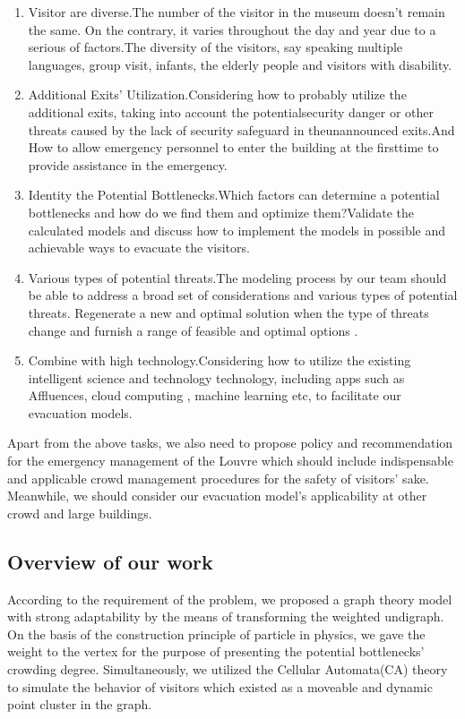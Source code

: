 \documentclass[12pt]{article}
\begin{document}
\begin{enumerate}
\item Visitor are diverse.The number of the visitor in the museum doesn't remain the same. On the contrary, it varies throughout the day and year due to a serious of factors.The diversity of the visitors, say speaking multiple languages, group visit, infants, the elderly people and visitors with disability.
\item Additional Exits' Utilization.Considering how to probably utilize the additional exits, taking into account the potentialsecurity danger or other threats caused by the lack of security safeguard in theunannounced exits.And How to allow emergency personnel to enter the building at the firsttime to provide assistance in the emergency.
\item Identity the Potential Bottlenecks.Which factors can determine a potential bottlenecks and how do we find them and optimize them?Validate the calculated models and discuss how to implement the models in possible and achievable ways to evacuate the visitors.
\item Various types of potential threats.The modeling process by our team should be able to address a broad set of considerations and various types of potential threats. Regenerate a new and optimal solution when the type of threats change and furnish a range of feasible and optimal options .
\item Combine with high technology.Considering how to utilize the existing intelligent science and technology technology, including apps such as Affluences, cloud computing , machine learning etc, to facilitate our evacuation models.
\end{enumerate}

Apart from the above tasks, we also need to propose policy and recommendation for the emergency management of the Louvre which should include indispensable and applicable crowd management procedures for the safety of visitors' sake. Meanwhile, we should consider our evacuation model's applicability at other crowd and large buildings.






\subsection{Overview of our work}
According to the requirement of the problem, we proposed a graph theory 
model with strong adaptability by the means of transforming the weighted 
undigraph. On the basis of the construction principle of particle in 
physics, we gave the weight to the vertex for the purpose of presenting 
the potential bottlenecks' crowding degree. Simultaneously, we utilized 
the Cellular Automata(CA) theory to simulate the behavior of visitors 
which existed as a moveable and dynamic point cluster in the graph.
\end{document}
